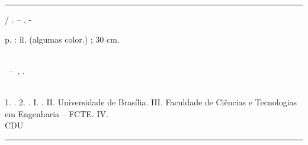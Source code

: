 \begin{fichacatalografica}
	\vspace*{\fill}					%
	\hrule							%
	\begin{center}					%
	\begin{minipage}[c]{12.5cm}		%
	
	\imprimirautor
	
	\hspace{0.5cm} \imprimirtitulo  / \imprimirautor. --
	\imprimirlocal, \imprimirdata-
	
	\hspace{0.5cm} \pageref{LastPage} p. : il. (algumas color.) ; 30 cm.\\
	
	\hspace{0.5cm} \imprimirorientadorRotulo~\imprimirorientador\\
	
	\hspace{0.5cm}
	\parbox[t]{\textwidth}{\imprimirtipotrabalho~--~\imprimirinstituicao,
	\imprimirdata.}\\
	
	\hspace{0.5cm}
		1. \imprimirpalavrachaveum.
		2. \imprimirpalavrachavedois.
		I. \imprimirorientador.
		II. Universidade de Brasília.
		III. Faculdade de Ciências e Tecnologias em Engenharia – FCTE.
		IV. \imprimirtitulo\\ 			
	
	\hspace{8.75cm} CDU \nomecdu\\
	
	\end{minipage}
	\end{center}
	\hrule
\end{fichacatalografica}
